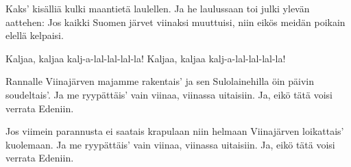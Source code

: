 
\beginverse*
Kaks' kisälliä kulki
maantietä laulellen.
Ja he laulussaan toi julki
ylevän aattehen:
Jos kaikki Suomen järvet
viinaksi muuttuisi,
niin eikös meidän poikain
elellä kelpaisi.
\endverse

\beginchorus
Kaljaa, kaljaa
kalj-a-lal-lal-lal-la!
Kaljaa, kaljaa
kalj-a-lal-lal-lal-la!
\endchorus

\beginverse*
Rannalle Viinajärven
majamme rakentais'
ja sen Sulolainehilla
öin päivin soudeltais'.
Ja me ryypättäis' vain viinaa,
viinassa uitaisiin.
Ja, eikö tätä voisi
verrata Edeniin.
\endverse

\beginverse*
Jos viimein parannusta
ei saatais krapulaan
niin helmaan Viinajärven
loikattais' kuolemaan.
Ja me ryypättäis' vain viinaa,
viinassa uitaisiin.
Ja, eikö tätä voisi
verrata Edeniin.
\endverse
\endsong